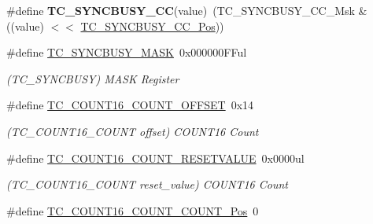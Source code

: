 \begin{DoxyCompactItemize}
\item 
\hypertarget{group___s_a_m_l21___t_c_gabef00e7fe8d3cf4773493ef18f0eb219}{}\#define {\bfseries T\+C\+\_\+\+S\+Y\+N\+C\+B\+U\+S\+Y\+\_\+\+C\+C}(value)~(T\+C\+\_\+\+S\+Y\+N\+C\+B\+U\+S\+Y\+\_\+\+C\+C\+\_\+\+Msk \& ((value) $<$$<$ \hyperlink{group___s_a_m_l21___t_c_ga6ecf52881dc715f5e01fb7c3814ac692}{T\+C\+\_\+\+S\+Y\+N\+C\+B\+U\+S\+Y\+\_\+\+C\+C\+\_\+\+Pos}))\label{group___s_a_m_l21___t_c_gabef00e7fe8d3cf4773493ef18f0eb219}

\item 
\hypertarget{group___s_a_m_l21___t_c_gad8dc9965e22ade1c8d1d50869da09b07}{}\#define \hyperlink{group___s_a_m_l21___t_c_gad8dc9965e22ade1c8d1d50869da09b07}{T\+C\+\_\+\+S\+Y\+N\+C\+B\+U\+S\+Y\+\_\+\+M\+A\+S\+K}~0x000000\+F\+Ful\label{group___s_a_m_l21___t_c_gad8dc9965e22ade1c8d1d50869da09b07}

\begin{DoxyCompactList}\small\item\em (T\+C\+\_\+\+S\+Y\+N\+C\+B\+U\+S\+Y) M\+A\+S\+K Register \end{DoxyCompactList}\item 
\hypertarget{group___s_a_m_l21___t_c_gad5527ff1e45cc3707a98b68c4ff18c64}{}\#define \hyperlink{group___s_a_m_l21___t_c_gad5527ff1e45cc3707a98b68c4ff18c64}{T\+C\+\_\+\+C\+O\+U\+N\+T16\+\_\+\+C\+O\+U\+N\+T\+\_\+\+O\+F\+F\+S\+E\+T}~0x14\label{group___s_a_m_l21___t_c_gad5527ff1e45cc3707a98b68c4ff18c64}

\begin{DoxyCompactList}\small\item\em (T\+C\+\_\+\+C\+O\+U\+N\+T16\+\_\+\+C\+O\+U\+N\+T offset) C\+O\+U\+N\+T16 Count \end{DoxyCompactList}\item 
\hypertarget{group___s_a_m_l21___t_c_ga0b2571b5059abd17998816214179143b}{}\#define \hyperlink{group___s_a_m_l21___t_c_ga0b2571b5059abd17998816214179143b}{T\+C\+\_\+\+C\+O\+U\+N\+T16\+\_\+\+C\+O\+U\+N\+T\+\_\+\+R\+E\+S\+E\+T\+V\+A\+L\+U\+E}~0x0000ul\label{group___s_a_m_l21___t_c_ga0b2571b5059abd17998816214179143b}

\begin{DoxyCompactList}\small\item\em (T\+C\+\_\+\+C\+O\+U\+N\+T16\+\_\+\+C\+O\+U\+N\+T reset\+\_\+value) C\+O\+U\+N\+T16 Count \end{DoxyCompactList}\item 
\hypertarget{group___s_a_m_l21___t_c_ga1f543bea0390de24abbf37a20d449098}{}\#define \hyperlink{group___s_a_m_l21___t_c_ga1f543bea0390de24abbf37a20d449098}{T\+C\+\_\+\+C\+O\+U\+N\+T16\+\_\+\+C\+O\+U\+N\+T\+\_\+\+C\+O\+U\+N\+T\+\_\+\+Pos}~0\label{group___s_a_m_l21___t_c_ga1f543bea0390de24abbf37a20d449098}


\end{DoxyCompactItemize}
